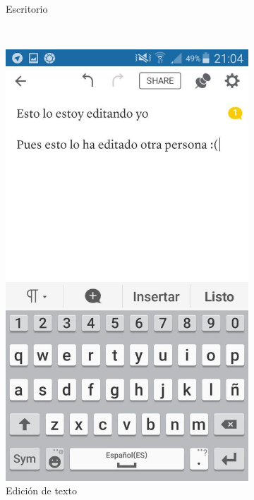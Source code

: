 \begin{figure}[H]
\begin{subfigure}[b]{0.3\textwidth}
                \caption{Escritorio}
                \label{fig:quipDesktop}
        \end{subfigure}
        ~
        \begin{subfigure}[b]{0.3\textwidth}
                \includegraphics[width=\textwidth]{Media/Captures/quipEdit.jpg}
                \caption{Edición de texto}
                \label{fig:quipText}
        \end{subfigure}
        ~
        \begin{subfigure}[b]{0.3\textwidth}

\end{subfigure}
\end{figure}
